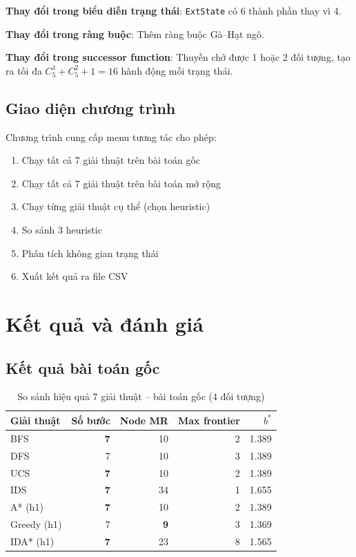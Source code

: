 \documentclass[a4paper,12pt]{article}
\begin{document}
\textbf{Thay đổi trong biểu diễn trạng thái}: \texttt{ExtState} có 6 thành phần thay vì 4.

\textbf{Thay đổi trong ràng buộc}: Thêm ràng buộc Gà--Hạt ngô.

\textbf{Thay đổi trong successor function}: Thuyền chở được 1 hoặc 2 đối tượng, tạo ra tối đa $C_5^1 + C_5^2 + 1 = 16$ hành động mỗi trạng thái.

\subsection{Giao diện chương trình}

Chương trình cung cấp menu tương tác cho phép:
\begin{enumerate}
    \item Chạy tất cả 7 giải thuật trên bài toán gốc
    \item Chạy tất cả 7 giải thuật trên bài toán mở rộng
    \item Chạy từng giải thuật cụ thể (chọn heuristic)
    \item So sánh 3 heuristic
    \item Phân tích không gian trạng thái
    \item Xuất kết quả ra file CSV
\end{enumerate}

\section{Kết quả và đánh giá}

\subsection{Kết quả bài toán gốc}

\begin{table}[H]
\centering
\caption{So sánh hiệu quả 7 giải thuật -- bài toán gốc (4 đối tượng)}
\label{tab:results_orig}
\begin{tabular}{@{}lrrrr@{}}
\toprule
\textbf{Giải thuật} & \textbf{Số bước} & \textbf{Node MR} & \textbf{Max frontier} & \textbf{$b^*$} \\
\midrule
BFS & \textbf{7} & 10 & 2 & 1.389 \\
DFS & 7 & 10 & 3 & 1.389 \\
UCS & \textbf{7} & 10 & 2 & 1.389 \\
IDS & \textbf{7} & 34 & 1 & 1.655 \\
A* (h1) & \textbf{7} & 10 & 2 & 1.389 \\
Greedy (h1) & 7 & \textbf{9} & 3 & 1.369 \\
IDA* (h1) & \textbf{7} & 23 & 8 & 1.565 \\
\bottomrule
\end{tabular}
\end{table}
\end{document}
